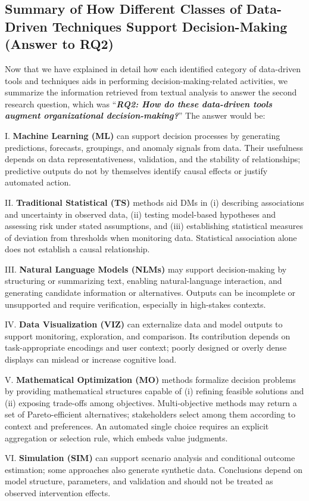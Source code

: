 \documentclass{sfuthesis}
\begin{document}
\subsection{Summary of How Different Classes of Data-Driven Techniques Support Decision-Making (Answer to RQ2)}
Now that we have explained in detail how each identified category of data-driven tools and techniques aids in performing decision-making-related activities, we summarize the information retrieved from textual analysis to answer the second research question, which was “\textbf{\textit{RQ2: How do these data-driven tools augment organizational decision-making?}}” The answer would be:\par
I.	\textbf{Machine Learning (ML)} can support decision processes by generating predictions, forecasts, groupings, and anomaly signals from data. Their usefulness depends on data representativeness, validation, and the stability of relationships; predictive outputs do not by themselves identify causal effects or justify automated action.\par
II.	\textbf{Traditional Statistical (TS)} methods aid DMs in (i) describing associations and uncertainty in observed data, (ii) testing model-based hypotheses and assessing risk under stated assumptions, and (iii) establishing statistical measures of deviation from thresholds when monitoring data. Statistical association alone does not establish a causal relationship.\par
III. \textbf{Natural Language Models (NLMs)} may support decision-making by structuring or summarizing text, enabling natural-language interaction, and generating candidate information or alternatives. Outputs can be incomplete or unsupported and require verification, especially in high-stakes contexts.\par
IV. \textbf{Data Visualization (VIZ)} can externalize data and model outputs to support monitoring, exploration, and comparison. Its contribution depends on task-appropriate encodings and user context; poorly designed or overly dense displays can mislead or increase cognitive load.\par
V.	\textbf{Mathematical Optimization (MO)} methods formalize decision problems by providing mathematical structures capable of (i) refining feasible solutions and (ii) exposing trade-offs among objectives. Multi-objective methods may return a set of Pareto-efficient alternatives; stakeholders select among them according to context and preferences. An automated single choice requires an explicit aggregation or selection rule, which embeds value judgments.\par
VI.	\textbf{Simulation (SIM)} can support scenario analysis and conditional outcome estimation; some approaches also generate synthetic data. Conclusions depend on model structure, parameters, and validation and should not be treated as observed intervention effects.\par
\end{document}
